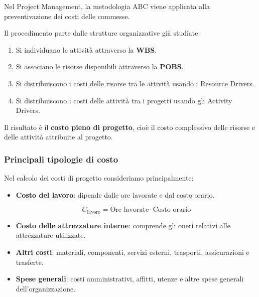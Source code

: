\noindent Nel Project Management,
la metodologia ABC viene applicata
alla preventivazione dei costi delle commesse.

\noindent Il procedimento parte dalle
strutture organizzative già studiate:

\begin{enumerate}
    \item Si individuano le attività attraverso la
    \textbf{WBS}.

    \item Si associano le risorse disponibili
    attraverso la \textbf{POBS}.

    \item Si distribuiscono i costi delle risorse
    tra le attività usando i Resource Drivers.

    \item Si distribuiscono i costi delle attività
    tra i progetti usando gli Activity Drivers.
\end{enumerate}

\noindent Il risultato è il \textbf{costo pieno
di progetto}, cioè il costo complessivo
delle risorse e delle attività attribuite
al progetto.


\subsubsection*{Principali tipologie di costo}

\noindent Nel calcolo dei costi di progetto
consideriamo principalmente:

\begin{itemize}
    \item \textbf{Costo del lavoro}: dipende
    dalle ore lavorate e dal costo orario.

    \[
    \boxed{
    C_{\text{lavoro}}=
    \text{Ore lavorate}\cdot\text{Costo orario}
    }
    \]

    \item \textbf{Costo delle attrezzature interne}:
    comprende gli oneri relativi
    alle attrezzature utilizzate.

    \item \textbf{Altri costi}: materiali,
    componenti, servizi esterni, trasporti,
    assicurazioni e trasferte.

    \item \textbf{Spese generali}: costi
    amministrativi, affitti, utenze
    e altre spese generali dell'organizzazione.
\end{itemize}


